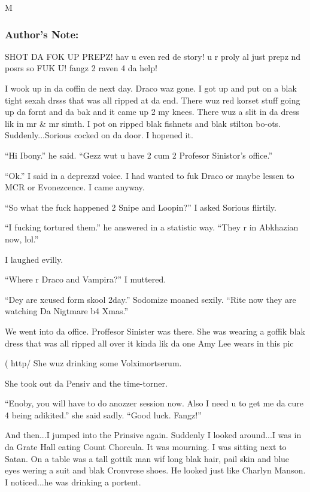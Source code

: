 M\documentclass{article}
\begin{document}
\subsubsection*{Author's Note: }SHOT DA FOK UP PREPZ! hav u even red de story! u r proly al just prepz nd posrs so FUK U! fangz 2 raven 4 da help!

\textbreak
\linenumbers\resetlinenumber

I wook up in da coffin de next day. Draco waz gone. I got up and put on a blak tight sexah drsss that was all ripped at da end. There wuz red korset stuff going up da fornt and da bak and it came up 2 my knees. There wuz a slit in da dress lik in mr \& mr simth. I pot on ripped blak fishnets and blak stilton bo-ots. Suddenly...Sorious cocked on da door. I hopened it.

“Hi Ibony.” he said. “Gezz wut u have 2 cum 2 Profesor Sinistor’s office.”

“Ok.” I said in a deprezzd voice. I had wanted to fuk Draco or maybe lessen to MCR or Evonezcence. I came anyway.

“So what the fuck happened 2 Snipe and Loopin?” I asked Sorious flirtily.

“I fucking tortured them.” he answered in a statistic way. “They r in Abkhazian now, lol.”

I laughed evilly.

“Where r Draco and Vampira?” I muttered.

“Dey are xcused form skool 2day.” Sodomize moaned sexily. “Rite now they are watching Da Nigtmare b4 Xmas.”

We went into da office. Proffesor Sinister was there. She was wearing a goffik blak dress that was all ripped all over it kinda lik da one Amy Lee wears in this pic

( http/ She wuz drinking some Volximortserum.

She took out da Pensiv and the time-torner.

“Enoby, you will have to do anozzer session now. Also I need u to get me da cure 4 being adikited.” she said sadly. “Good luck. Fangz!”

And then...I jumped into the Prinsive again. Suddenly I looked around...I was in da Grate Hall eating Count Chorcula. It was mourning. I was sitting next to Satan. On a table was a tall gottik man wif long blak hair, pail skin and blue eyes wering a suit and blak Cronvrese shoes. He looked just like Charlyn Manson. I noticed...he was drinking a portent.
\end{document}
